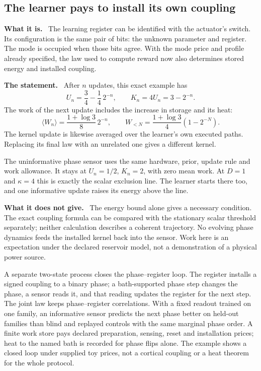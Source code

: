\documentclass[11pt]{article}
\newcommand{\what}{\par\smallskip\noindent\textbf{What it is.}\ }
\newcommand{\statement}{\par\smallskip\noindent\textbf{The statement.}\ }
\newcommand{\scope}{\par\smallskip\noindent\textbf{What it does not give.}\ }
\begin{document}
\subsection{The learner pays to install its own coupling}
\label{sec:learned-installation}

\what
The learning register can be identified with the actuator's switch. Its
configuration is the same pair of bits: the unknown parameter and register.
The mode is occupied when those bits agree. With the mode price and profile
already specified, the law used to compute reward now also determines stored
energy and installed coupling.

\statement
After $n$ updates, this exact example has
\[
 U_n=\frac34-\frac14\,2^{-n},\qquad K_n=4U_n=3-2^{-n}.
\]
The work of the next update includes the increase in storage and its heat:
\[
 \langle W_n\rangle=\frac{1+\log3}{8}\,2^{-n},\qquad
 W_{<N}=\frac{1+\log3}{4}(1-2^{-N}).
\]
The kernel update is likewise averaged over the learner's own executed paths.
Replacing its final law with an unrelated one gives a different kernel.

The uninformative phase sensor uses the same hardware, prior, update rule and
work allowance. It stays at $U_n=1/2$, $K_n=2$, with zero mean work.
At $D=1$ and $\kappa=4$ this is exactly the scalar exclusion line. The learner
starts there too, and one informative update raises its energy above the line.

\scope
The energy bound alone gives a necessary condition. The exact coupling formula
can be compared with the stationary scalar threshold separately; neither
calculation describes a coherent trajectory. No evolving phase dynamics feeds
the installed kernel back into the sensor. Work here is an expectation under
the declared reservoir model, not a demonstration of a physical power source.

A separate two-state process closes the phase--register loop. The register
installs a signed coupling to a binary phase; a bath-supported phase step
changes the phase, a sensor reads it, and that reading updates the register
for the next step. The joint law keeps phase--register correlations. With a
fixed readout trained on one family, an informative sensor predicts the next
phase better on held-out families than blind and replayed controls with the
same marginal phase order. A finite work store pays declared preparation,
sensing, reset and installation prices; heat to the named bath is recorded
for phase flips alone. The example shows a closed loop under supplied toy
prices, not a cortical coupling or a heat theorem for the whole protocol.
\end{document}
